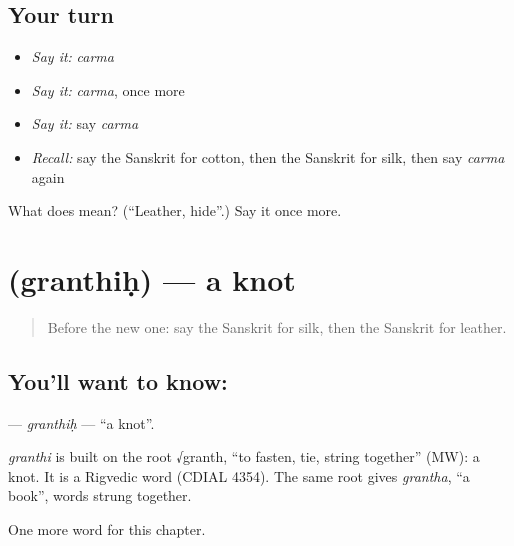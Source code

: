 \subsection*{Your turn}
\begin{itemize}
\raggedright
  \item \emph{Say it:} \emph{carma}
  \item \emph{Say it:} \emph{carma}, once more
  \item \emph{Say it:} say \emph{carma}
  \item \emph{Recall:} say the Sanskrit for cotton, then the Sanskrit for silk, then say \emph{carma} again
\end{itemize}

\begin{tcolorbox}[breakable,colback=teal!4,colframe=teal!35!black,title={Before you move on}]
What does  mean? (\textquotedblleft{}Leather, hide\textquotedblright{}.) Say it once more.
\end{tcolorbox}
\section[\texorpdfstring{\sk{ग्रन्थिः} (granthiḥ)}{ग्रन्थिः (granthiḥ)}]{ (granthiḥ) — a knot}

\label{lesson:SA-C221-granthih}



\begin{quote}
Before the new one: say the Sanskrit for silk, then the Sanskrit for leather.
\end{quote}

\subsection*{You'll want to know: }
\textbf{} — \emph{granthiḥ} — \textquotedblleft{}a knot\textquotedblright{}.

\begin{cousinweb}
\emph{granthi} is built on the root √granth, \textquotedblleft{}to fasten, tie, string together\textquotedblright{} (MW): a knot. It is a Rigvedic word (CDIAL 4354). The same root gives \emph{grantha}, \textquotedblleft{}a book\textquotedblright{}, words strung together.
\end{cousinweb}

\begin{grammarlens}[title={What you've built}]
One more word for this chapter.
\end{grammarlens}

